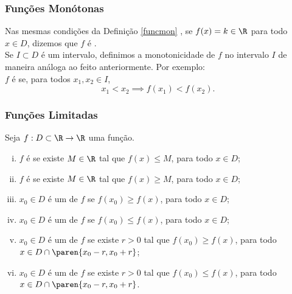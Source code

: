 \documentclass[brazil, notheorems, 10pt]{beamer}
\begin{document}
\begin{frame}
\frametitle{Funções Monótonas} %



Nas mesmas condições da Definição \ref{funcmon} , se $f(x) = k \in
\R$ para todo $x \in D$, dizemos que $f$ é .\\ \pause
Se $I \subset D$ é um intervalo, definimos a monotonicidade de $f$
no intervalo $I$ de maneira análoga ao feito anteriormente. Por
exemplo: \\
$f$ é  se, para todos
$x_1, x_2 \in I$,
	$$x_1 < x_2 \implies f(x_1) < f(x_2).$$


\end{frame}




\begin{frame}
\frametitle{Funções Limitadas} %

\begin{definicao}
Seja $f: D \subset \R \to \R$ uma função.
\begin{enumerate}[(i)]
	\item $f$ é  se existe $M \in \R$ tal
	que $f(x) \leq M$, para todo $x \in D$;
	\item $f$ é  se existe $M \in \R$ tal
	que $f(x) \geq M$, para todo $x \in D$;
	\item $x_0 \in D$ é um  de $f$ se
	$f(x_0) \geq f(x)$, para todo $x \in D$;
	\item $x_0 \in D$ é um  de $f$ se
	$f(x_0) \leq f(x)$, para todo $x \in D$;
	\item $x_0 \in D$ é um  de $f$ se
	existe $r>0$ tal que $f(x_0) \geq f(x)$, para todo $x \in D \cap \paren{x_0 - r , x_0+r}$;
	\item $x_0 \in D$ é um  de $f$ se
	existe $r>0$ tal que $f(x_0) \leq f(x)$, para todo $x \in D \cap \paren{x_0 - r ,
	x_0+r}$.
\end{enumerate}
\end{definicao}

\end{frame}
\end{document}
